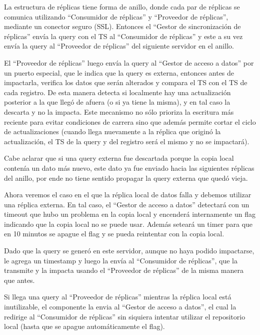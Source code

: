 La estructura de réplicas tiene forma de anillo, donde cada par de réplicas se comunica utilizando “Consumidor de réplicas” y “Proveedor de réplicas”, mediante un conector seguro (SSL). Entonces el “Gestor de sincronización de réplicas” envía la query con el TS al “Consumidor de réplicas” y este a su vez envía la query al “Proveedor de réplicas” del siguiente servidor en el anillo.

El “Proveedor de réplicas” luego envía la query al “Gestor de acceso a datos” por un puerto especial, que le indica que la query es externa, entonces antes de impactarla, verifica los datos que serán alterados y compara el TS con el TS de cada registro. De esta manera detecta si localmente hay una actualización posterior a la que llegó de afuera (o si ya tiene la misma), y en tal caso la descarta y no la impacta. Este mecanismo no sólo prioriza la escritura más reciente para evitar condiciones de carrera sino que además permite cortar el ciclo de actualizaciones (cuando llega nuevamente a la réplica que originó la actualización, el TS de la query y del registro será el mismo y no se impactará).

Cabe aclarar que si una query externa fue descartada porque la copia local contenía un dato más nuevo, este dato ya fue enviado hacia las siguientes réplicas del anillo, por ende no tiene sentido propagar la query externa que quedó vieja.

Ahora veremos el caso en el que la réplica local de datos falla y debemos utilizar una réplica externa. En tal caso, el “Gestor de acceso a datos” detectará con un timeout que hubo un problema en la copia local y encenderá internamente un flag indicando que la copia local no se puede usar. Además seteará un timer para que en 10 minutos se apague el flag y se pueda reintentar con la copia local.

Dado que la query se generó en este servidor, aunque no haya podido impactarse, le agrega un timestamp y luego la envía al “Consumidor de réplicas”, que la transmite y la impacta usando el “Proveedor de réplicas” de la misma manera que antes.

Si llega una query al “Proveedor de réplicas” mientras la réplica local está inutilizable, el componente la envia al “Gestor de acceso a datos”, el cual la redirige al “Consumidor de réplicas” sin siquiera intentar utilizar el repositorio local (hasta que se apague automáticamente el flag).

